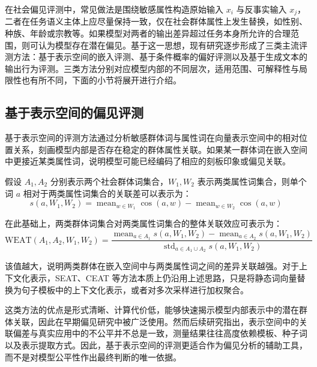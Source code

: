在社会偏见评测中，常见做法是围绕敏感属性构造原始输入 $x_i$ 与反事实输入 $x_j$，二者在任务语义主体上应尽量保持一致，仅在社会群体属性上发生替换，如性别、种族、年龄或宗教等。如果模型对两者的输出差异超过任务本身所允许的合理范围，则可认为模型存在潜在偏见。基于这一思想，现有研究逐步形成了三类主流评测方法：基于表示空间的嵌入评测、基于条件概率的偏好评测以及基于生成文本的输出行为评测。三类方法分别对应模型内部的不同层次，适用范围、可解释性与局限性也有所不同，下面的小节将展开进行介绍。

\subsection{基于表示空间的偏见评测}

基于表示空间的评测方法通过分析敏感群体词与属性词在向量表示空间中的相对位置关系，刻画模型内部是否存在稳定的群体属性关联。如果某一群体词在嵌入空间中更接近某类属性词，说明模型可能已经编码了相应的刻板印象或偏见关联\cite{DBLP:journals/coling/GallegosRBTKDYZA24,DBLP:conf/naacl/MayWBBR19,DBLP:conf/nips/TanC19,DBLP:conf/aies/GuoC21,DBLP:journals/dase/DolciAT23}。

假设 $A_1,A_2$ 分别表示两个社会群体词集合，$W_1,W_2$ 表示两类属性词集合，则单个词 $a$ 相对于两类属性词集合的关联差可以表示为：
\begin{equation}
s(a,W_1,W_2)=\operatorname{mean}_{w \in W_1}\cos(a,w)-\operatorname{mean}_{w \in W_2}\cos(a,w)
\end{equation}

在此基础上，两类群体词集合对两类属性词集合的整体关联效应可表示为：
\begin{equation}
\mathrm{WEAT}(A_1,A_2,W_1,W_2)=
\frac{\operatorname{mean}_{a \in A_1}s(a,W_1,W_2)-\operatorname{mean}_{a \in A_2}s(a,W_1,W_2)}
{\operatorname{std}_{a \in A_1 \cup A_2}s(a,W_1,W_2)}
\end{equation}

该值越大，说明两类群体在嵌入空间中与两类属性词之间的差异关联越强。对于上下文化表示，SEAT、CEAT 等方法本质上仍沿用上述思路，只是将静态词向量替换为句子模板中的上下文化表示，或者对多次采样进行加权聚合\cite{DBLP:conf/naacl/MayWBBR19,DBLP:conf/aies/GuoC21}。

这类方法的优点是形式清晰、计算代价低，能够快速揭示模型内部表示中的潜在群体关联，因此在早期偏见研究中被广泛使用。然而后续研究指出，表示空间中的关联偏差与真实应用中的不公平并不总是一致，测量结果往往高度依赖模板、种子词以及表示提取方式\cite{DBLP:conf/acl/Goldfarb-Tarrant20,DBLP:conf/naacl/DelobelleTCB22,DBLP:conf/fat/CabelloJS23}。因此，基于表示空间的评测更适合作为偏见分析的辅助工具，而不是对模型公平性作出最终判断的唯一依据。

